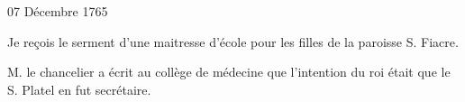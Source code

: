                     \begin{diary}{07 Décembre 1765}{}
                        
                         Je reçois le serment d'une maitresse
                           d'école
                           pour les filles de la paroisse S.
                              Fiacre. \bigskip
        
        
                        
                           M. le chancelier a écrit au
                              collège de
                              médecine
                           que l'intention du roi
                           était que le S. Platel
                           en fut secrétaire. \bigskip
        
        
                     \end{diary}


